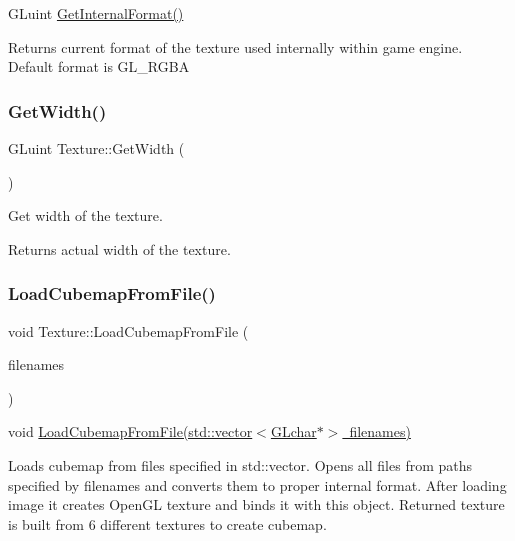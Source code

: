 G\+Luint \mbox{\hyperlink{class_texture_a8a45061cc3ef1c5de2ac8a0977658de1}{Get\+Internal\+Format()}} 

Returns current format of the texture used internally within game engine. Default format is G\+L\+\_\+\+R\+G\+BA \mbox{\label{class_texture_af1186a3204c49bf2a8cd09550299b0c9}} 
\subsubsection{\texorpdfstring{GetWidth()}{GetWidth()}}
{\footnotesize\ttfamily G\+Luint Texture\+::\+Get\+Width (\begin{DoxyParamCaption}{ }\end{DoxyParamCaption})}



Get width of the texture. 

Returns actual width of the texture. \mbox{\label{class_texture_a056053b6bb3b6ed3bb44a624f0fb62c7}} 
\subsubsection{\texorpdfstring{LoadCubemapFromFile()}{LoadCubemapFromFile()}}
{\footnotesize\ttfamily void Texture\+::\+Load\+Cubemap\+From\+File (\begin{DoxyParamCaption}\item[{std\+::vector$<$ G\+Lchar $\ast$ $>$}]{filenames }\end{DoxyParamCaption})}



void \mbox{\hyperlink{class_texture_a056053b6bb3b6ed3bb44a624f0fb62c7}{Load\+Cubemap\+From\+File(std\+::vector$<$\+G\+Lchar$\ast$$>$ filenames)}} 

Loads cubemap from files specified in std\+::vector. Opens all files from paths specified by filenames and converts them to proper internal format. After loading image it creates Open\+GL texture and binds it with this object. Returned texture is built from 6 different textures to create cubemap. \mbox{\label{class_texture_a26134f37b4a22ff895686533937ba218}} 
